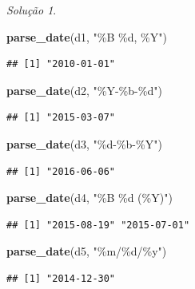 \documentclass[
]{latex/krantz}
\newenvironment{Shaded}{\begin{snugshade}}{\end{snugshade}}
\newcommand{\FunctionTok}[1]{\textcolor[rgb]{0.13,0.29,0.53}{\textbf{#1}}}
\newcommand{\NormalTok}[1]{#1}
\newcommand{\StringTok}[1]{\textcolor[rgb]{0.31,0.60,0.02}{#1}}
\theoremstyle{definition}
\theoremstyle{definition}
\theoremstyle{definition}
\theoremstyle{definition}
\theoremstyle{remark}
\newtheorem*{solution}{Solução}
\begin{document}
\begin{solution}
\leavevmode

\begin{Shaded}
\begin{Highlighting}[]
\FunctionTok{parse\_date}\NormalTok{(d1, }\StringTok{"\%B \%d, \%Y"}\NormalTok{)}
\end{Highlighting}
\end{Shaded}

\begin{verbatim}
## [1] "2010-01-01"
\end{verbatim}

\begin{Shaded}
\begin{Highlighting}[]
\FunctionTok{parse\_date}\NormalTok{(d2, }\StringTok{"\%Y{-}\%b{-}\%d"}\NormalTok{)}
\end{Highlighting}
\end{Shaded}

\begin{verbatim}
## [1] "2015-03-07"
\end{verbatim}

\begin{Shaded}
\begin{Highlighting}[]
\FunctionTok{parse\_date}\NormalTok{(d3, }\StringTok{"\%d{-}\%b{-}\%Y"}\NormalTok{)}
\end{Highlighting}
\end{Shaded}

\begin{verbatim}
## [1] "2016-06-06"
\end{verbatim}

\begin{Shaded}
\begin{Highlighting}[]
\FunctionTok{parse\_date}\NormalTok{(d4, }\StringTok{"\%B \%d (\%Y)"}\NormalTok{)}
\end{Highlighting}
\end{Shaded}

\begin{verbatim}
## [1] "2015-08-19" "2015-07-01"
\end{verbatim}

\begin{Shaded}
\begin{Highlighting}[]
\FunctionTok{parse\_date}\NormalTok{(d5, }\StringTok{"\%m/\%d/\%y"}\NormalTok{)}
\end{Highlighting}
\end{Shaded}

\begin{verbatim}
## [1] "2014-12-30"
\end{verbatim}


\end{solution}
\end{document}
